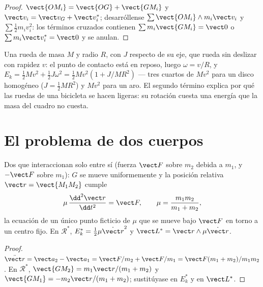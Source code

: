 \begin{proof}
$\vect{OM_i} = \vect{OG} + \vect{GM_i}$ y $\vect v_i = \vect v_G + \vect v_i^*$;
desarróllense $\sum\vect{OM_i}\wedge m_i\vect v_i$ y $\sum\tfrac12 m_iv_i^2$: los
términos cruzados contienen $\sum m_i\vect{GM_i} = \vect 0$ o $\sum m_i\vect v_i^* = \vect 0$
y se anulan.
\end{proof}

\begin{example}\label{ex:b1:systems-of-points:rolling}
Una rueda de masa $M$ y radio $R$, con  $J$ respecto de
su eje, que rueda sin deslizar con rapidez $v$: el punto de contacto está
en reposo, luego $\omega = v/R$, y $E_k = \tfrac12 Mv^2 + \tfrac12 J\omega^2 = \tfrac12 Mv^2(1 +
J/MR^2)$ --- tres cuartos de $Mv^2$ para un disco homogéneo ($J = \tfrac12 MR^2$)
y $Mv^2$ para un aro. El segundo término explica por qué las ruedas de una
bicicleta se hacen ligeras: su rotación cuesta una energía que la masa del
cuadro no cuesta.
\end{example}

\section{El problema de dos cuerpos}

\begin{proposition}\label{prop:b1:systems-of-points:twobody}
Dos  que interaccionan solo entre sí (fuerza $\vect F$
sobre $m_2$ debida a $m_1$, y $-\vect F$ sobre $m_1$): $G$ se mueve
uniformemente y la posición relativa $\vect r = \vect{M_1M_2}$ cumple
\[
\mu\,\frac{\dd^2\vect r}{\dd t^2} = \vect F, \qquad \mu = \frac{m_1m_2}{m_1 + m_2},
\]
la ecuación de un único punto ficticio de \emph{} $\mu$ que
se mueve bajo $\vect F$ en torno a un centro fijo. En $\mathcal R^*$, $E_k^* =
\tfrac12\mu\dot{\vect r}^2$ y $\vect L^* = \vect r\wedge\mu\dot{\vect r}$.
\end{proposition}

\begin{proof}
$\ddot{\vect r} = \vect a_2 - \vect a_1 = \vect F/m_2 + \vect F/m_1 = \vect F(m_1 +
m_2)/m_1m_2$. En $\mathcal R^*$, $\vect{GM_2} = m_1\vect r/(m_1 + m_2)$ y
$\vect{GM_1} = -m_2\vect r/(m_1 + m_2)$; sustitúyase en $E_k^*$ y en $\vect L^*$.
\end{proof}

